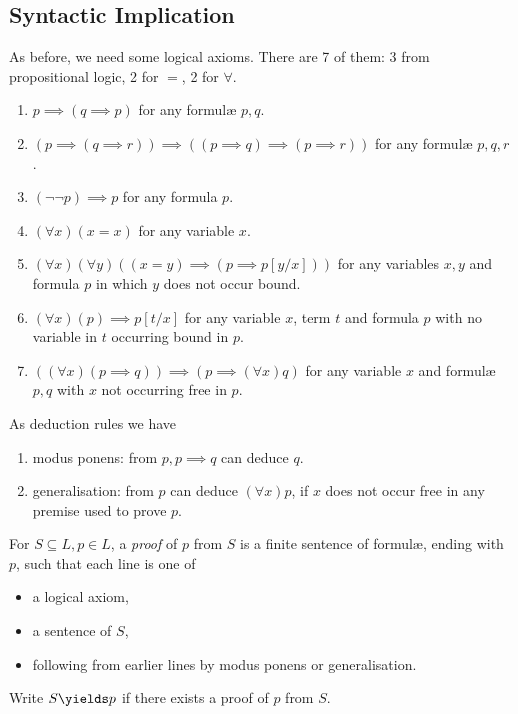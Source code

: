 \documentclass[a4paper]{article}
\begin{document}
\subsection{Syntactic Implication}

As before, we need some logical axioms. There are 7 of them: 3 from propositional logic, 2 for \(=\), 2 for \(\forall\).

\begin{enumerate}
\item \(p \implies (q \implies p)\) for any formulæ \(p, q\).
\item \((p \implies (q \implies r)) \implies ((p \implies q) \implies (p \implies r))\) for any formulæ \(p, q, r\).
\item \((\neg\neg p) \implies p\) for any formula \(p\).
\item \((\forall x) (x = x)\) for any variable \(x\).
\item \((\forall x) (\forall y) ((x = y) \implies (p \implies p[y/x]))\) for any variables \(x, y\) and formula \(p\) in which \(y\) does not occur bound.
\item \((\forall x) (p) \implies p[t/x]\) for any variable \(x\), term \(t\) and formula \(p\) with no variable in \(t\) occurring bound in \(p\).
\item \(((\forall x) (p \implies q)) \implies (p \implies (\forall x) q)\) for any variable \(x\) and formulæ \(p, q\) with \(x\) not occurring free in \(p\).
\end{enumerate}

As deduction rules we have
\begin{enumerate}
\item modus ponens: from \(p, p \implies q\) can deduce \(q\).
\item generalisation: from \(p\) can deduce \((\forall x) p\), if \(x\) does not occur free in any premise used to prove \(p\).
\end{enumerate}

\begin{definition}[Proof]
  For \(S \subseteq L, p \in L\), a \emph{proof} of \(p\) from \(S\) is a finite sentence of formulæ, ending with \(p\), such that each line is one of
  \begin{itemize}
  \item a logical axiom,
  \item a sentence of \(S\),
  \item following from earlier lines by modus ponens or generalisation.
  \end{itemize}
  Write \(S \yields p\) if there exists a proof of \(p\) from \(S\).
\end{definition}
\end{document}
